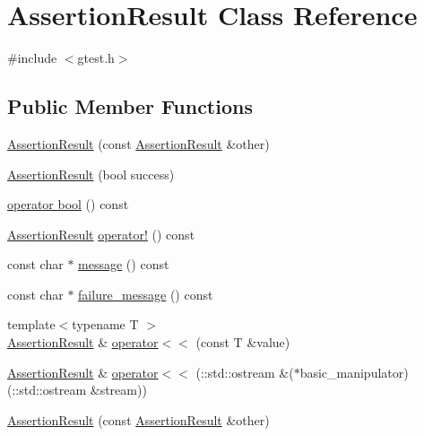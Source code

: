\hypertarget{classtesting_1_1AssertionResult}{\section{\-Assertion\-Result \-Class \-Reference}
\label{dd/d5f/classtesting_1_1AssertionResult}
}


{\ttfamily \#include $<$gtest.\-h$>$}

\subsection*{\-Public \-Member \-Functions}
\begin{DoxyCompactItemize}
\item 
\hyperlink{classtesting_1_1AssertionResult_adfc7c37883985778a3d3f4f8cf0fecf1}{\-Assertion\-Result} (const \hyperlink{classtesting_1_1AssertionResult}{\-Assertion\-Result} \&other)
\item 
\hyperlink{classtesting_1_1AssertionResult_a0b9b65a26886b23693cbc71bcb242c2f}{\-Assertion\-Result} (bool success)
\item 
\hyperlink{classtesting_1_1AssertionResult_aa385aa18f5e42db5a415c25a90f4193d}{operator bool} () const 
\item 
\hyperlink{classtesting_1_1AssertionResult}{\-Assertion\-Result} \hyperlink{classtesting_1_1AssertionResult_a8569a100f4db8e2861d390326b1b9794}{operator!} () const 
\item 
const char $\ast$ \hyperlink{classtesting_1_1AssertionResult_a9477c5ee8f0751018d646f748d5730b0}{message} () const 
\item 
const char $\ast$ \hyperlink{classtesting_1_1AssertionResult_abcd7608307338bfa5ce51e045ba09833}{failure\-\_\-message} () const 
\item 
{\footnotesize template$<$typename T $>$ }\\\hyperlink{classtesting_1_1AssertionResult}{\-Assertion\-Result} \& \hyperlink{classtesting_1_1AssertionResult_aba40d0b5bf8bfa326fc5c841f292aca4}{operator$<$$<$} (const \-T \&value)
\item 
\hyperlink{classtesting_1_1AssertionResult}{\-Assertion\-Result} \& \hyperlink{classtesting_1_1AssertionResult_a5363ebd66dbf2d1f2226032c470def13}{operator$<$$<$} (\-::std\-::ostream \&($\ast$basic\-\_\-manipulator)(\-::std\-::ostream \&stream))
\item 
\hyperlink{classtesting_1_1AssertionResult_adfc7c37883985778a3d3f4f8cf0fecf1}{\-Assertion\-Result} (const \hyperlink{classtesting_1_1AssertionResult}{\-Assertion\-Result} \&other)

\end{DoxyCompactItemize}
